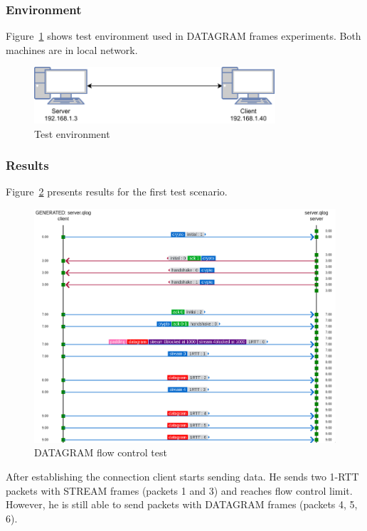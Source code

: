 \subsubsection{Environment}
\label{subsubsec:test-env}
Figure~\ref{fig:dgram_test_env} shows test environment used in DATAGRAM frames experiments.
Both machines are in local network.

\begin{figure}[h]
    \centering
    \includegraphics[width=0.8\textwidth]{img/__09__datagrams/dgram_test_env.pdf}
    \caption{Test environment}
    \label{fig:dgram_test_env}
\end{figure}

\subsubsection{Results}
Figure~\ref{fig:dgram_flow_control} presents results for the first test scenario.

\begin{figure}
    \centering
    \includegraphics[width=\textwidth]{img/__09__datagrams/dgram_flow_control.png}
    \caption{DATAGRAM flow control test}
    \label{fig:dgram_flow_control}
\end{figure}

After establishing the connection client starts sending data.
He sends two 1-RTT packets with STREAM frames (packets 1 and 3) and reaches flow control limit.
However, he is still able to send packets with DATAGRAM frames (packets 4, 5, 6).

